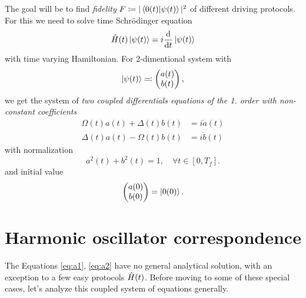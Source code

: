 The goal will be to find \emph{fidelity} $F\coloneqq |\braket{0(t)|\psi(t)}|^2$ of different driving protocols. For this we need to solve time Schr\"odinger equation
\begin{equation}
    \hat{H}(t)\ket{\psi(t)}=i\frac{\mathrm{d}}{\mathrm{d} t}\ket{\psi(t)}
\end{equation}
with time varying Hamiltonian. For 2-dimentional system with 
\begin{equation}
    \ket{\psi(t)}\eqqcolon \begin{pmatrix}
         a(t) \\
         b(t)    
    \end{pmatrix},
\end{equation}
we get the system of \emph{two coupled differentials equations of the 1. order with non-constant coefficients}
\begin{align}
    \Omega(t)a(t)+\Delta(t)b(t)&=i\dot a(t)\label{eq:a1}\\
    \Delta(t)a(t)-\Omega(t)b(t)&=i\dot b(t)
    \label{eq:a2}
\end{align}
with normalization
\begin{equation}
    a^2(t)+b^2(t)=1, \quad \forall t\in [0,T_f].
    \label{eq:normalizationCondition}
\end{equation}
and initial value 
\begin{equation}
    \begin{pmatrix}
        a(0)\\b(0)
    \end{pmatrix} = \ket{0(0)}.
\end{equation}















\section{Harmonic oscillator correspondence}
The Equations \ref{eq:a1}, \ref{eq:a2} have no general analytical solution, with an exception to a few easy protocols $\hat{H}(t)$. Before moving to some of these special cases, let's analyze this coupled system of equations generally.

